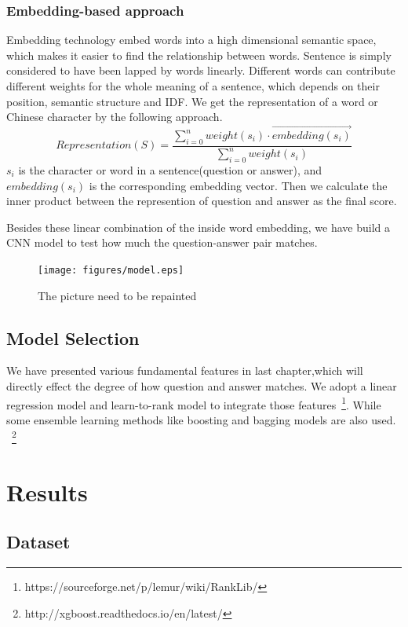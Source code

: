 \documentclass{llncs}
\begin{document}
\subsubsection{Embedding-based approach}
\label{sec:embedding}
Embedding technology embed words into a high dimensional semantic space, which makes it easier to find the relationship between words. Sentence is simply considered to have been lapped by words linearly. Different words can contribute different weights for the whole meaning of a sentence, which depends on their position, semantic structure and IDF.
We get the representation of a word or Chinese character by the following approach.
\begin{equation}
Representation(S) = \frac{\sum_{i=0}^n weight(s_i)\cdot \overrightarrow { embedding(s_i)} }{\sum_{i=0}^n weight(s_i) }
\label{eq:representation}
\end{equation}
$s_i$ is the character or word in a sentence(question or answer), and $embedding(s_i)$ is the corresponding embedding vector. Then we  calculate the inner product between the represention of question and answer as the final score.

Besides these linear combination of the inside word embedding, we have build a CNN model to test how much the question-answer pair matches.
\begin{figure}
\centering
\texttt{[image: figures/model.eps]}
\caption{ The picture need to be repainted}
\label{fig:model}
\end{figure}



\subsection{Model Selection}
\label{sec:model}
We have presented various fundamental features in last chapter,which will directly effect the degree of how question and answer matches. We adopt a linear regression model and learn-to-rank model \cite{Liu2009Learning} to integrate those features~\footnote{https://sourceforge.net/p/lemur/wiki/RankLib/}. While some ensemble learning methods like boosting and bagging models are also used.~\cite{Chen2016XGBoost} ~\footnote{http://xgboost.readthedocs.io/en/latest/}


\section{Results}
\label{sec:results}

\subsection{Dataset}
\end{document}
